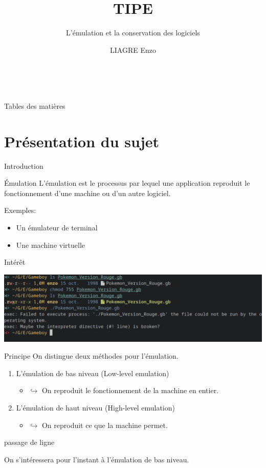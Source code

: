 \documentclass{beamer}
\title{TIPE}
\author{L'émulation et la conservation des logiciels}
\institute{}
\date{\scriptsize LIAGRE Enzo}
\begin{document}
    
    \begin{frame}
        \titlepage\
    \end{frame}

    
    \begin{frame}{Tables des matières}
        \tableofcontents
    \end{frame}
    
    \section{Présentation du sujet}

    \begin{frame}{Introduction}
        \begin{block}{Émulation}
            L'émulation est le processus par lequel une application reproduit le fonctionnement d'une machine ou d'un autre logiciel.
        \end{block}
        Exemples:
        \begin{itemize}
            \item Un émulateur de terminal
            \item Une machine virtuelle
        \end{itemize}
    \end{frame}

    \begin{frame}{Intérêt}
        \begin{center} 
            \includegraphics[width=1\textwidth]{images/erreur_permission.png}
        \end{center}   
    \end{frame}

    \begin{frame}{Principe}
        On distingue deux méthodes pour l'émulation.
        \begin{enumerate}
            \item L'émulation de bas niveau (Low-level emulation)
            \begin{itemize}
                \item[\color{white}] $\hookrightarrow$ On reproduit le fonctionnement de la machine en entier.
            \end{itemize}
            \item L'émulation de haut niveau (High-level emulation)
            \begin{itemize}
                \item[\color{white}] $\hookrightarrow$ On reproduit ce que la machine permet.
            \end{itemize}
        \end{enumerate}
        {\color{white} passage de ligne}

        On s'intéressera pour l'instant à l'émulation de bas niveau.
    \end{frame}
\end{document}
